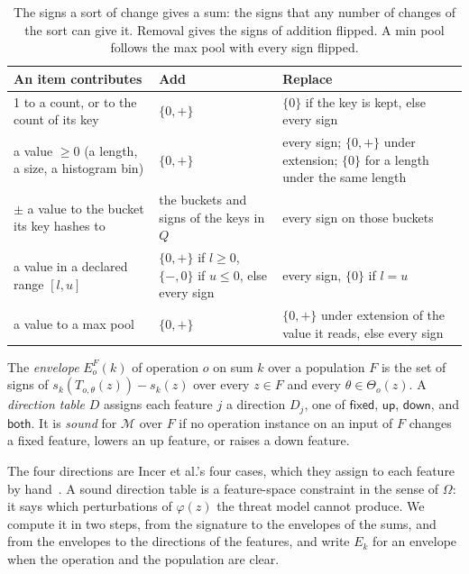 \begin{table}[t]
  \caption{The signs a sort of change gives a sum: the signs that any number of changes of the sort can give it.
  Removal gives the signs of addition flipped. A min pool follows the max pool with every sign flipped.}
  \label{tab:fw:signs}
  \small
  \begin{tabular}{@{}p{}p{}p{}@{}}
    \toprule
    An item contributes & Add & Replace \\
    \midrule
    1 to a count, or to the count of its key & $\{0, +\}$ & $\{0\}$ if the key is kept, else every sign \\
    a value $\ge 0$ (a length, a size, a histogram bin) & $\{0, +\}$ & every sign; $\{0, +\}$ under extension; $\{0\}$
      for a length under the same length \\
    $\pm$ a value to the bucket its key hashes to & the buckets and signs of the keys in $Q$ & every sign on those
      buckets \\
    a value in a declared range $[l, u]$ & $\{0, +\}$ if $l \ge 0$, $\{-, 0\}$ if $u \le 0$, else every sign & every
      sign, $\{0\}$ if $l = u$ \\
    a value to a max pool & $\{0, +\}$ & $\{0, +\}$ under extension of the value it reads, else every sign \\
    \bottomrule
  \end{tabular}
\end{table}

\label{def:fw:directions}
{
The \emph{envelope} $E^F_o(k)$ of operation $o$ on sum $k$ over a population $F$ is the set of signs of
$s_k(T_{o,\theta}(z)) - s_k(z)$ over every $z \in F$ and every $\theta \in \Theta_o(z)$. A \emph{direction table} $D$
assigns each feature $j$ a direction $D_j$, one of $\mathsf{fixed}$, $\mathsf{up}$, $\mathsf{down}$, and
$\mathsf{both}$. It is \emph{sound} for $\mathcal{M}$ over $F$ if no operation instance on an input of $F$ changes a
fixed feature, lowers an up feature, or raises a down feature.
}

\noindent The four directions are Incer et al.'s four cases, which they assign to each feature by
hand~\cite{incer2018adversarially}. A sound direction table is a feature-space constraint in the sense of $\Omega$: it
says which perturbations of $\varphi(z)$ the threat model cannot produce. We compute it in two steps, from the
signature to the envelopes of the sums, and from the envelopes to the directions of the features, and write $E_k$
for an envelope when the operation and the population are clear.

